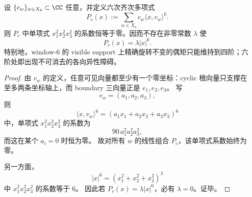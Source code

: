 \begin{proposition}[六阶旋转不变的不可实现性]\label{prop:window6-visible-degree6-isotropy-obstruction}
设 \(\{c_w\}_{w\in X_6}\subset \CC\) 任意，并定义六次齐次多项式
\[
P_c(x):=\sum_{w\in X_6}c_w\langle x,v_w\rangle^6.
\]
则 \(P_c\) 中单项式 \(x_1^2x_2^2x_3^2\) 的系数恒等于零。因而不存在非零常数 \(\lambda\) 使
\[
P_c(x)=\lambda |x|^6.
\]
特别地，window-\(6\) 的 visible support 上精确旋转不变的偶矩只能维持到四阶；六阶处即出现不可消去的各向异性障碍。
\end{proposition}
\begin{proof}
由 \(v_w\) 的定义，任意可见向量都至少有一个零坐标：cyclic 根向量只支撑在至多两条坐标轴上，而 boundary 三向量正是 \(e_1,e_2,e_3\)。
写
\[
v_w=(a_1,a_2,a_3),
\]
则
\[
\langle x,v_w\rangle^6=(a_1x_1+a_2x_2+a_3x_3)^6
\]
中，单项式 \(x_1^2x_2^2x_3^2\) 的系数为
\[
90\,a_1^2a_2^2a_3^2,
\]
而这在某个 \(a_i=0\) 时恒为零。
故对所有 \(w\) 的线性组合 \(P_c\)，该单项式系数始终为零。

另一方面，
\[
|x|^6=(x_1^2+x_2^2+x_3^2)^3
\]
中 \(x_1^2x_2^2x_3^2\) 的系数等于 \(6\)。
因此若 \(P_c(x)=\lambda |x|^6\)，必有 \(\lambda=0\)。证毕。
\end{proof}

